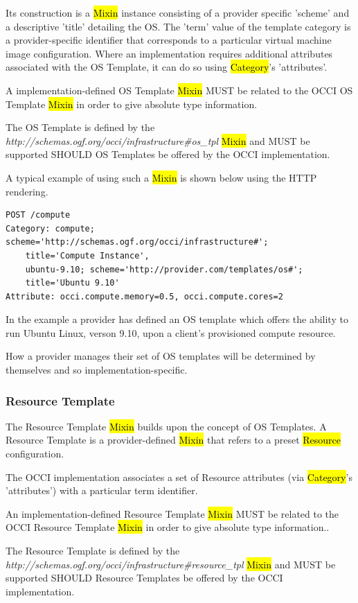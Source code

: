 \documentclass[10pt,a4paper]{article}
\begin{document}
Its construction is a \hl{Mixin} instance consisting of a provider specific 'scheme' and a descriptive 'title' 
detailing the OS. The 'term' value of the template category is a provider-specific identifier that 
corresponds to a particular virtual machine image configuration. Where an implementation requires 
additional attributes associated with the OS Template, it can do so using \hl{Category}'s 'attributes'.

A implementation-defined OS Template \hl{Mixin} MUST be related to 
the OCCI OS Template \hl{Mixin} in order to give absolute type information. 

The OS Template 
is defined by the \textit{http://schemas.ogf.org/occi/infrastructure\#os\_tpl} \hl{Mixin} and
MUST be supported SHOULD OS Templates be offered by the OCCI implementation.

A typical example of using such a \hl{Mixin} is shown below using the HTTP rendering.

\begin{verbatim}
POST /compute
Category: compute; scheme='http://schemas.ogf.org/occi/infrastructure#'; 
    title='Compute Instance', 
    ubuntu-9.10; scheme='http://provider.com/templates/os#'; 
    title='Ubuntu 9.10'
Attribute: occi.compute.memory=0.5, occi.compute.cores=2
\end{verbatim}
In the example a provider has defined an OS template which offers the ability to run Ubuntu Linux,
verson 9.10, upon a client's provisioned compute resource.

How a provider manages their set of OS templates will be determined by themselves and so 
implementation-specific.

\subsubsection{Resource Template}
The Resource Template \hl{Mixin} builds upon the concept of OS Templates. A Resource Template is
a provider-defined \hl{Mixin} that refers to a preset \hl{Resource} configuration. 

The OCCI implementation associates a set of Resource attributes (via \hl{Category}'s 'attributes') with 
a particular term identifier. 

An implementation-defined Resource Template \hl{Mixin} MUST be related 
to the OCCI Resource Template \hl{Mixin} in order to give absolute type information.. 

The Resource Template is defined by the 
\textit{http://schemas.ogf.org/occi/infrastructure\#resource\_tpl} \hl{Mixin} and MUST be supported SHOULD Resource Templates be offered by the OCCI implementation.
\end{document}
